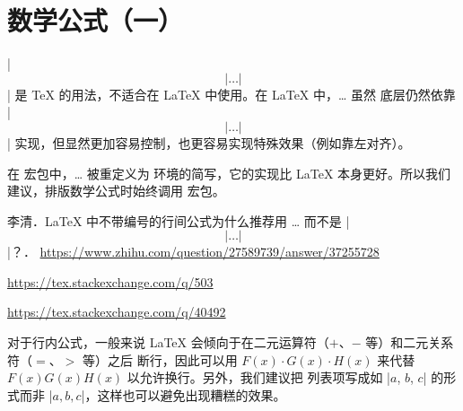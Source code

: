 

%
%
%
%


\let\fancybreak\relax

\section{数学公式（一）}
\label{sec:math-i}



|$$|\ldots|$$| 是 \TeX{} 的用法，不适合在 \LaTeX{} 中使用。在 \LaTeX{} 中，\cs{[}\ldots\cs{]} 虽然
底层仍然依靠 |$$|\ldots|$$| 实现，但显然更加容易控制，也更容易实现特殊效果（例如靠左对齐）。

在  宏包中，\cs{[}\ldots\cs{]} 被重定义为  环境的简写，它的实现比
\LaTeX{} 本身更好。所以我们建议，排版数学公式时始终调用  宏包。

\begin{reference}
  \item 李清．\LaTeX{} 中不带编号的行间公式为什么推荐用 \cs{[}\ldots\cs{]} 而不是 |$$|\ldots|$$|？．
    \url{https://www.zhihu.com/question/27589739/answer/37255728}
  \item \url{https://tex.stackexchange.com/q/503}
  \item \url{https://tex.stackexchange.com/q/40492}
\end{reference}



对于行内公式，一般来说 \LaTeX{} 会倾向于在二元运算符（$+$、$-$ 等）和二元关系符（$=$、$>$ 等）之后
断行，因此可以用 $F(x) \cdot G(x) \cdot H(x)$ 来代替 $F(x)G(x)H(x)$ 以允许换行。另外，我们建议把
列表项写成如 |$a$, $b$, $c$| 的形式而非 |$a, b, c$|，这样也可以避免出现糟糕的效果。

